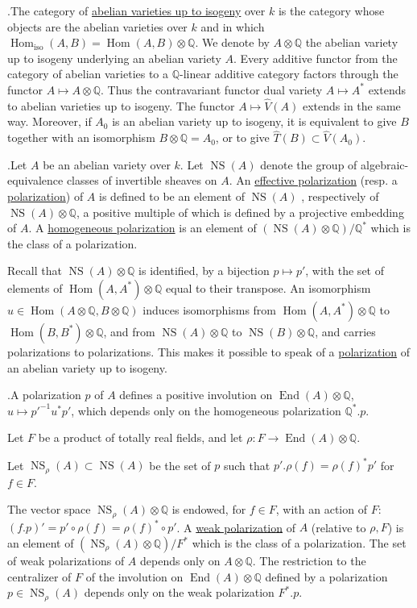 \documentclass[10pt]{article}
\newcommand{\Q}{\mathbb Q}
\newcommand{\Hom}{\operatorname{Hom}}
\newcommand{\End}{\operatorname{End}}
\newcommand{\NS}{\operatorname{NS}}
\begin{document}
.\quad The category of \uline{abelian varieties up to isogeny} over $k$ is the category whose objects are the abelian varieties over $k$ and in which $\Hom_{\mathrm{iso}}(A,B)=\Hom(A,B)\otimes\Q$. We denote by $A\otimes\Q$ the abelian variety up to isogeny \textquotedbl{}underlying\textquotedbl{} an abelian variety $A$. Every additive functor from the category of abelian varieties to a $\Q$-linear additive category factors through the functor $A\mapsto A\otimes\Q$. Thus the contravariant functor \textquotedbl{}dual variety\textquotedbl{} $A\mapsto A^*$ extends to abelian varieties up to isogeny. The functor $A\mapsto\widehat V(A)$ extends in the same way. Moreover, if $A_0$ is an abelian variety up to isogeny, it is equivalent to give $B$ together with an isomorphism $B\otimes\Q=A_0$, or to give $\widehat T(B)\subset\widehat V(A_0)$.

.\quad Let $A$ be an abelian variety over $k$. Let $\NS(A)$ denote the group of algebraic-equivalence classes of invertible sheaves on $A$. An \uline{effective polarization} (resp. a \uline{polarization}) of $A$ is defined to be an element of $\NS(A)$%
, respectively of $\NS(A)\otimes\Q$, a positive multiple of which is defined by a projective embedding of $A$. A \uline{homogeneous polarization} is an element of $(\NS(A)\otimes\Q)/\Q^*$ which is the class of a polarization.

Recall that $\NS(A)\otimes\Q$ is identified, by a bijection $p\mapsto p'$, with the set of elements of $\Hom(A,A^*)\otimes\Q$ equal to their transpose. An isomorphism $u\in\Hom(A\otimes\Q,B\otimes\Q)$ induces isomorphisms from $\Hom(A,A^*)\otimes\Q$ to $\Hom(B,B^*)\otimes\Q$, and from $\NS(A)\otimes\Q$ to $\NS(B)\otimes\Q$, and carries polarizations to polarizations. This makes it possible to speak of a \uline{polarization} of an abelian variety up to isogeny.

.\quad A polarization $p$ of $A$ defines a positive involution on $\End(A)\otimes\Q$, $u\longmapsto p'^{-1}u^*p'$, which depends only on the homogeneous polarization $\Q^*.p$.

Let $F$ be a product of totally real fields, and let $\rho:F\longrightarrow\End(A)\otimes\Q$.

Let $\NS_\rho(A)\subset\NS(A)$ be the set of $p$ such that $p'.\rho(f)=\rho(f)^*p'$ for $f\in F$.

The vector space $\NS_\rho(A)\otimes\Q$ is endowed, for $f\in F$, with an action of $F$: $(f.p)'=p'\circ\rho(f)=\rho(f)^*\circ p'$. A \uline{weak polarization} of $A$ (relative to $\rho,F$) is an element of $(\NS_\rho(A)\otimes\Q)/F^*$ which is the class of a polarization. The set of weak polarizations of $A$ depends only on $A\otimes\Q$. The restriction to the centralizer of $F$ of the involution on $\End(A)\otimes\Q$ defined by a polarization $p\in\NS_\rho(A)$ depends only on the weak polarization $F^*.p$.
\end{document}

